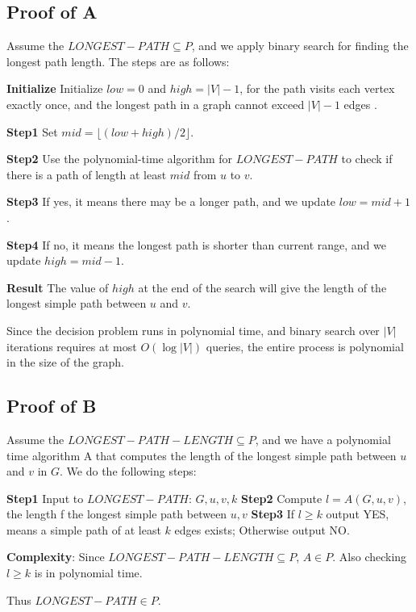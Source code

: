 \documentclass[12pt]{article}
\begin{document}
\subsection{Proof of A}
Assume the $LONGEST-PATH \subseteq P$, and we apply binary search for finding the longest path length. The steps are as follows:

\textbf{Initialize} Initialize $low = 0$ and $high = |V| - 1$, for the path visits each vertex exactly once, and the longest path in a graph cannot exceed $|V| - 1$ edges . 

\textbf{Step1} Set $mid = \lfloor (low + high) / 2 \rfloor$.

\textbf{Step2} Use the polynomial-time algorithm for $LONGEST-PATH$ to check if there is a path of length at least $mid$ from $u$ to $v$.

\textbf{Step3} If yes, it means there may be a longer path, and we update $low = mid + 1$.

\textbf{Step4} If no, it means the longest path is shorter than current range, and we update $high = mid - 1$.

\textbf{Result} The value of $high$ at the end of the search will give the length of the longest simple path between $u$ and $v$.

Since the decision problem runs in polynomial time, and binary search over $|V|$ iterations requires at most $O(\log |V|)$ queries, the entire process is polynomial in the size of the graph.

\subsection{Proof of B}
Assume the $LONGEST-PATH-LENGTH \subseteq P$, and we have a polynomial time algorithm A that computes the length of the longest simple path between $u$ and $v$ in $G$. We do the following steps:

\textbf{Step1} Input to $LONGEST-PATH$: $G, u, v, k$
\textbf{Step2} Compute $l=A(G,u,v)$, the length f the longest simple path between $u,v$
\textbf{Step3} If $l \ge k$ output YES, means a simple path of at least $k$ edges exists; Otherwise output NO.

\textbf{Complexity}: Since $LONGEST-PATH-LENGTH \subseteq P$, $A \in P$. Also checking $l \ge k$ is in polynomial time.

Thus $LONGEST-PATH \in P$.
\end{document}
